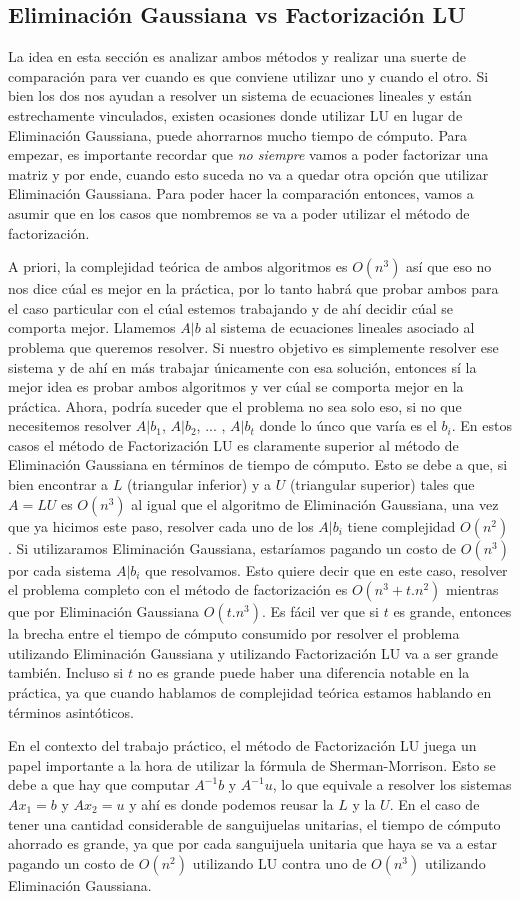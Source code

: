 \subsection{Eliminación Gaussiana vs Factorización LU}
La idea en esta sección es analizar ambos métodos y realizar una suerte de comparación para ver cuando es que conviene utilizar uno y cuando el otro. Si bien los dos nos ayudan a resolver un sistema de ecuaciones lineales y están estrechamente vinculados, existen ocasiones donde utilizar LU en lugar de Eliminación Gaussiana, puede ahorrarnos mucho tiempo de cómputo. Para empezar, es importante recordar que \textit{no siempre} vamos a poder factorizar una matriz y por ende, cuando esto suceda no va a quedar otra opción que utilizar Eliminación Gaussiana. Para poder hacer la comparación entonces, vamos a asumir que en los casos que nombremos se va a poder utilizar el método de factorización.
\par A priori, la complejidad teórica de ambos algoritmos es $O(n^3)$ así que eso no nos dice cúal es mejor en la práctica, por lo tanto habrá que probar ambos para el caso particular con el cúal estemos trabajando y de ahí decidir cúal se comporta mejor. Llamemos $A|b$ al sistema de ecuaciones lineales asociado al problema que queremos resolver. Si nuestro objetivo es simplemente resolver ese sistema y de ahí en más trabajar únicamente con esa solución, entonces sí la mejor idea es probar ambos algoritmos y ver cúal se comporta mejor en la práctica. Ahora, podría suceder que el problema no sea solo eso, si no que necesitemos resolver $A|b_1$, $A|b_2$, ... , $A|b_t$ donde lo únco que varía es el $b_i$. En estos casos el método de Factorización LU es claramente superior al método de Eliminación Gaussiana en términos de tiempo de cómputo. Esto se debe a que, si bien encontrar a $L$ (triangular inferior) y a $U$ (triangular superior) tales que $A = LU$ es $O(n^3)$ al igual que el algoritmo de Eliminación Gaussiana, una vez que ya hicimos este paso, resolver cada uno de los $A|b_i$ tiene complejidad $O(n^2)$. Si utilizaramos Eliminación Gaussiana, estaríamos pagando un costo de $O(n^3)$ por cada sistema $A|b_i$ que resolvamos. Esto quiere decir que en este caso, resolver el problema completo con el método de factorización es $O(n^3 + t.n^2)$ mientras que por Eliminación Gaussiana $O(t.n^3)$. Es fácil ver que si $t$ es grande, entonces la brecha entre el tiempo de cómputo consumido por resolver el problema utilizando Eliminación Gaussiana y utilizando Factorización LU va a ser grande también. Incluso si $t$ no es grande puede haber una diferencia notable en la práctica, ya que cuando hablamos de complejidad teórica estamos hablando en términos asintóticos.
\par En el contexto del trabajo práctico, el método de Factorización LU juega un papel importante a la hora de utilizar la fórmula de Sherman-Morrison. Esto se debe a que hay que computar $A^{-1}b$ y $A^{-1}u$, lo que equivale a resolver los sistemas $Ax_1 = b$ y $Ax_2 = u$ y ahí es donde podemos reusar la $L$ y la $U$. En el caso de tener una cantidad considerable de sanguijuelas unitarias, el tiempo de cómputo ahorrado es grande, ya que por cada sanguijuela unitaria que haya se va a estar pagando un costo de $O(n^2)$ utilizando LU contra uno de $O(n^3)$ utilizando Eliminación Gaussiana.
